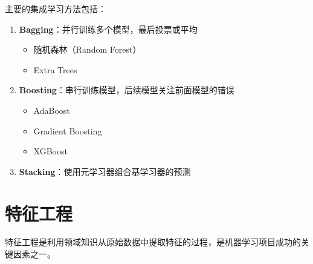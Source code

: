 \begin{example}[集成学习方法]
    主要的集成学习方法包括：
    \begin{enumerate}
        \item \textbf{Bagging}：并行训练多个模型，最后投票或平均
              \begin{itemize}
                  \item 随机森林（Random Forest）
                  \item Extra Trees
              \end{itemize}
        \item \textbf{Boosting}：串行训练模型，后续模型关注前面模型的错误
              \begin{itemize}
                  \item AdaBoost
                  \item Gradient Boosting
                  \item XGBoost
              \end{itemize}
        \item \textbf{Stacking}：使用元学习器组合基学习器的预测
    \end{enumerate}
\end{example}

\section{特征工程}

\begin{definition}[特征工程]
    特征工程是利用领域知识从原始数据中提取特征的过程，是机器学习项目成功的关键因素之一。
\end{definition}

